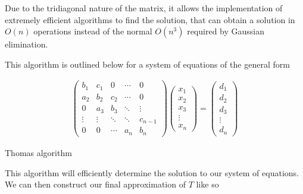 \documentclass[10pt]{amsart}
\numberwithin{equation}{section}
\theoremstyle{definition}
\begin{document}
\begin{multicols}{2}
Due to the tridiagonal nature of the matrix, it allows the implementation of
extremely efficient algorithms to find the solution, that can obtain a solution
in $O(n)$ operations instead of the normal $O\left(n^3\right)$ required by
Gaussian elimination.

This algorithm is outlined below for a system of equations of the general form

\begin{align*}
  \begin{pmatrix}
    b_1 & c_1 & 0 & \cdots & 0 \\
    a_2 & b_2 & c_2 & \cdots & 0\\
    0 & a_3 & b_3 & \ddots & \vdots\\
    \vdots & \vdots & \ddots & \ddots & c_{n-1}\\
    0 & 0 & \cdots & a_n & b_n
  \end{pmatrix}
  \begin{pmatrix}
    x_1 \\ x_2 \\ x_3 \\ \vdots \\ x_n
  \end{pmatrix}
  =
  \begin{pmatrix}
    d_1 \\ d_2 \\ d_3 \\ \vdots \\ d_n
  \end{pmatrix}
\end{align*}

\begin{algorithm}[H]
  \caption{Thomas algorithm}
  \begin{algorithmic}
    \EndIf
    \EndFor
    \Else
    \EndIf
    \EndFor
  \end{algorithmic}
\end{algorithm}

This algorithm will efficiently determine the solution to our system of
equations. We can then construct our final approximation of $T$ like so


\end{multicols}
\end{document}
